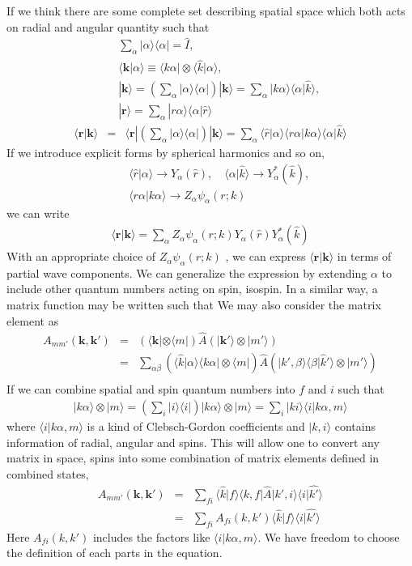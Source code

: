 \documentclass[10pt]{book}
\def\bm{\boldsymbol}
\newcommand{\bea}{\begin{eqnarray}}
\newcommand{\eea}{\end{eqnarray}}
\newcommand{\no}{\nonumber \\}
\def\vk{{\bm k}}
\def\vr{{\bm r}}
\def\la{\langle}
\def\ra{\rangle}
\begin{document}
If we think there are some complete set describing spatial space
which both acts on radial and angular quantity such that 
\bea 
& &\sum_{\alpha} |\alpha\ra \la \alpha|= \hat{I} ,\no 
& &\la \vk|\alpha\ra \equiv \la k\alpha|\otimes  \la \hat{k}|\alpha\ra ,\no 
& &|\vk\ra =\left( \sum_\alpha |\alpha\ra \la \alpha| \right)  |\vk\ra 
           =\sum_\alpha |k \alpha\ra \la \alpha|\hat{k}\ra  ,\no 
& &|\vr\ra =\sum_\alpha |r \alpha\ra \la  \alpha|\hat{r}\ra            
\eea 
\bea 
\la \vr|\vk\ra &=&\la \vr| \left( \sum_{\alpha}|\alpha\ra\la \alpha|\right) |\vk\ra
                =\sum_{\alpha} \la \hat{r}|\alpha\ra \la r\alpha|k\alpha \ra \la \alpha|\hat{k}\ra 
\eea 
If we introduce explicit forms by spherical harmonics and so on,
\bea 
& &\la \hat{r}|\alpha\ra \to Y_\alpha(\hat{r}) ,\quad \la \alpha|\hat{k}\ra \to Y^*_\alpha(\hat{k}),\no 
& &\la r\alpha|k\alpha \ra \to Z_\alpha \psi_{\alpha}(r;k)
\eea 
we can write 
\bea 
\la \vr|\vk\ra =\sum_\alpha Z_\alpha \psi_{\alpha}(r;k) Y_\alpha(\hat{r})Y^*_\alpha(\hat{k}) 
\eea 
With an appropriate choice of $Z_\alpha \psi_{\alpha}(r;k)$ , we can express $\la \vr|\vk\ra$
in terms of partial wave components. We can generalize the expression 
by extending $\alpha$ to include other quantum numbers acting on spin, isospin. 
In a similar way, a matrix function may be written such that
We may also consider the matrix element as
\bea 
A_{mm'}(\vk,\vk')&=&\left(\la \vk|\otimes\la m|\right) \hat{A} \left(|\vk'\ra\otimes|m'\ra\right) \no 
      &=&\sum_{\alpha\beta} \left(\la \hat{k}|\alpha\ra \la k\alpha|  \otimes\la m|\right)\hat{A}
         \left(|k',\beta\ra \la \beta| \hat{k}'\ra\otimes|m'\ra\right) \no
\eea 
If we can combine spatial and spin quantum numbers into $f$ and $i$ such that
\bea 
|k\alpha\ra \otimes |m\ra =\left(\sum_i |i\ra \la i |\right) |k\alpha\ra \otimes |m\ra
                          =\sum_i |k i \ra \la i | k\alpha ,m\ra 
\eea 
where $\la i | k\alpha ,m\ra$ is a kind of Clebsch-Gordon coefficients and 
$|k,i\ra$ contains information of radial, angular and spins. 
This will allow one to convert any matrix in space, spins into 
some combination of matrix elements defined in combined states,
\bea 
A_{mm'}(\vk,\vk')&=& \sum_{fi} \la \hat{k}|f\ra \la k,f|\hat{A}|k',i\ra \la i|\hat{k'}\ra \no 
                 &=& \sum_{fi}  A_{fi}(k,k') \la \hat{k}|f\ra \la i|\hat{k'}\ra
\eea  
Here $A_{fi}(k,k')$ includes the factors like $\la i | k\alpha ,m\ra$. 
We have freedom to choose the definition of each parts in the equation. 
 
\end{document}
